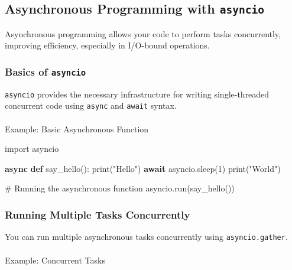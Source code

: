 \documentclass[
  letterpaper,
  DIV=11,
  numbers=noendperiod]{scrreprt}
\makeatletter
\let\oldparagraph\paragraph
\renewcommand{\paragraph}{
    \@ifstar
      \xxxParagraphStar
      \xxxParagraphNoStar
  }
\newcommand{\xxxParagraphStar}[1]{\oldparagraph*{#1}\mbox{}}
\newcommand{\xxxParagraphNoStar}[1]{\oldparagraph{#1}\mbox{}}
\newenvironment{Shaded}{\begin{snugshade}}{\end{snugshade}}
\newcommand{\BuiltInTok}[1]{\textcolor[rgb]{0.00,0.23,0.31}{#1}}
\newcommand{\CommentTok}[1]{\textcolor[rgb]{0.37,0.37,0.37}{#1}}
\newcommand{\ControlFlowTok}[1]{\textcolor[rgb]{0.00,0.23,0.31}{\textbf{#1}}}
\newcommand{\DecValTok}[1]{\textcolor[rgb]{0.68,0.00,0.00}{#1}}
\newcommand{\ImportTok}[1]{\textcolor[rgb]{0.00,0.46,0.62}{#1}}
\newcommand{\KeywordTok}[1]{\textcolor[rgb]{0.00,0.23,0.31}{\textbf{#1}}}
\newcommand{\NormalTok}[1]{\textcolor[rgb]{0.00,0.23,0.31}{#1}}
\newcommand{\StringTok}[1]{\textcolor[rgb]{0.13,0.47,0.30}{#1}}
\makeatother
\begin{document}
\subsection{\texorpdfstring{Asynchronous Programming with
\texttt{asyncio}}{Asynchronous Programming with asyncio}}\label{asynchronous-programming-with-asyncio}

Asynchronous programming allows your code to perform tasks concurrently,
improving efficiency, especially in I/O-bound operations.

\subsubsection{\texorpdfstring{Basics of
\texttt{asyncio}}{Basics of asyncio}}\label{basics-of-asyncio}

\texttt{asyncio} provides the necessary infrastructure for writing
single-threaded concurrent code using \texttt{async} and \texttt{await}
syntax.

\paragraph{Example: Basic Asynchronous
Function}\label{example-basic-asynchronous-function}

\begin{Shaded}
\begin{Highlighting}[]
\ImportTok{import}\NormalTok{ asyncio}

\ControlFlowTok{async} \KeywordTok{def}\NormalTok{ say\_hello():}
    \BuiltInTok{print}\NormalTok{(}\StringTok{"Hello"}\NormalTok{)}
    \ControlFlowTok{await}\NormalTok{ asyncio.sleep(}\DecValTok{1}\NormalTok{)}
    \BuiltInTok{print}\NormalTok{(}\StringTok{"World"}\NormalTok{)}

\CommentTok{\# Running the asynchronous function}
\NormalTok{asyncio.run(say\_hello())}
\end{Highlighting}
\end{Shaded}

\subsubsection{Running Multiple Tasks
Concurrently}\label{running-multiple-tasks-concurrently}

You can run multiple asynchronous tasks concurrently using
\texttt{asyncio.gather}.

\paragraph{Example: Concurrent Tasks}\label{example-concurrent-tasks}
\end{document}
